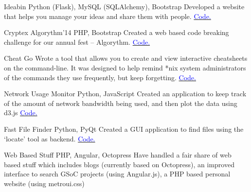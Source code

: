     {Ideabin}
    {}
    {\scriptsize Python (Flask), MySQL (SQLAlchemy), Bootstrap}
    {}
    {
        Developed a website that helps you manage your ideas and share them with people.
        \hfill
        \href{http://github.com/ideabin/ideabin/}{\textcolor{blue}{\scriptsize Code.}}
    }
    \vspace*{0.2\baselineskip}

    {Cryptex}
    {Algorythm'14}
    {\scriptsize PHP, Bootstrap}
    {}
    {
        Created a web based code breaking challenge for our annual fest -- Algorythm.
        \hfill
        \href{http://github.com/jdevlabs/cryptex/}{\textcolor{blue}{\scriptsize Code.}}
    }
    \vspace*{0.2\baselineskip}

\cventry{}
    {Cheat}
    {}
    {\scriptsize Go}
    {}
    {
        Wrote a tool that allows you to create and view interactive cheatsheets on the command-line. It was designed to help remind *nix system administrators of the commands they use frequently, but keep forgetting.
        \hfill
        \href{http://github.com/dufferzafar/cheat/}{\textcolor{blue}{\scriptsize Code.}}
    }
    \vspace*{0.2\baselineskip}

\cventry{}
    {Network Usage Monitor}
    {}
    {\scriptsize Python, JavaScript}
    {}
    {
        Created an application to keep track of the amount of network bandwidth being used, and then
        plot the data using d3.js
        \hfill
        \href{https://github.com/dufferzafar/netuse}{\textcolor{blue}{\scriptsize Code.}}
    }
    \vspace*{0.2\baselineskip}

\cventry{}
    {Fast File Finder}
    {}
    {\scriptsize Python, PyQt}
    {}
    {
        Created a GUI application to find files using the `locate' tool as backend.
        \hfill
        \href{https://github.com/dufferzafar/loki/}{\textcolor{blue}{\scriptsize Code.}}
    }
    \vspace*{0.2\baselineskip}

\cventry{}
    {Web Based Stuff}
    {}
    {\scriptsize PHP, Angular, Octopress}
    {}
    {
        Have handled a fair share of web based stuff which includes
        blogs (currently based on Octopress),
        an improved interface to search GSoC projects (using Angular.js),
        a PHP based personal website (using metroui.css)
    }
    \vspace*{0.2\baselineskip}

